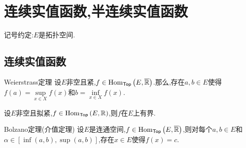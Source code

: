 \chapter{连续实值函数,半连续实值函数}

记号约定:$E$是拓扑空间.

\section{连续实值函数}

\begin{theorem}{Weierstrass定理}{}
	设$E$非空且紧,$f\in\operatorname{Hom}_{\mathsf{Top}}\left(E,\overline{\mathbb{R}}\right)$.那么,存在$a,b\in E$使得$f\left(a\right)=\sup\limits_{x\in X}f\left(x\right)$和$b=\inf\limits_{x\in X}f\left(x\right)$.
\end{theorem}

\begin{corollary}{}{}
	设$E$非空且拟紧,$f\in\operatorname{Hom}_{\mathsf{Top}}\left(E,\mathbb{R}\right)$,则$f$在$E$上有界.
\end{corollary}

\begin{theorem}{Bolzano定理(介值定理)}{}
	设$E$是连通空间,$f\in\operatorname{Hom}_{\mathsf{Top}}\left(E,\overline{\mathbb{R}}\right)$,则对每个$a,b\in E$和$\alpha\in\left[\inf\left(a,b\right),\sup\left(a,b\right)\right]$,存在$x\in E$使得$f\left(x\right)=c$.
\end{theorem}



